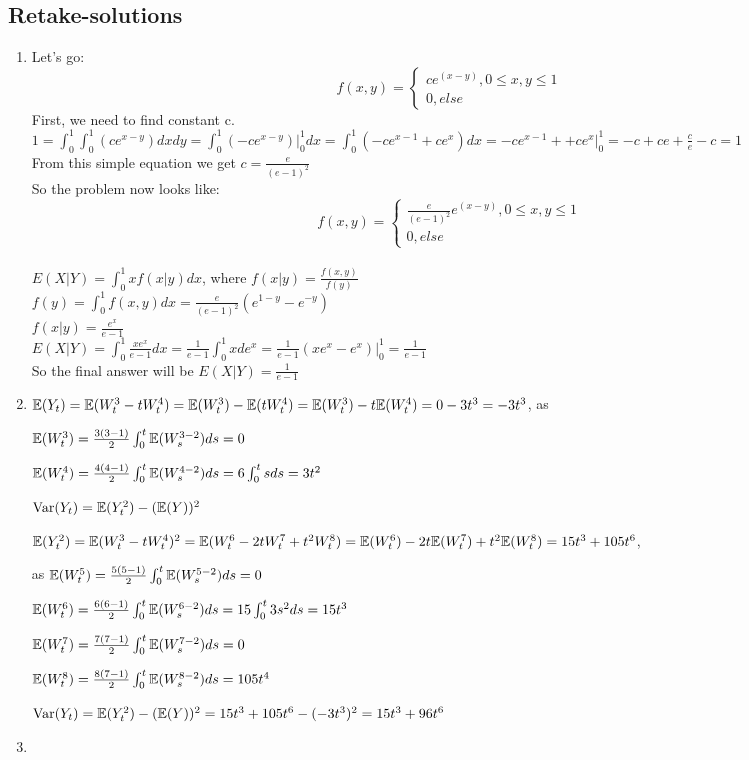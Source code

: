 \documentclass[12pt, a4paper]{article}
\begin{document}
\subsection{Retake-solutions}
\begin{enumerate}
\item Let's go:
\[
f(x,y)=
   \begin{cases}
   ce^{(x-y)}, 0 \leqslant x,y \leqslant 1\\
   0, else
      \end{cases}
\]
First, we need to find constant c.\\
$ 1=\int_{0}^{1} \int_{0}^{1} (ce^{x-y})dxdy=\int_{0}^{1}(-ce^{x-y})\bigg|_0^1dx=\int_{0}^{1}(-ce^{x-1}+ce^x)dx=-ce^{x-1}++ce^x\bigg|_0^1=-c+ce+\frac{c}{e}-c=1$\\
From this simple equation we get $c=\frac{e}{(e-1)^2}$\\
So the problem now looks like:
\[
f(x,y)=
\begin{cases}
   \frac{e}{(e-1)^2}e^{(x-y)}, 0 \leqslant x,y \leqslant 1\\
   0, else
\end{cases}
\]\\
$E(X|Y)=\int_{0}^{1}xf(x|y)dx$, where $f(x|y)=\frac{f(x,y)}{f(y)}$\\
$f(y)=\int_{0}^{1}f(x,y)dx=\frac{e}{(e-1)^2}(e^{1-y}-e^{-y})$\\
$f(x|y)=\frac{e^x}{e-1}$\\
$E(X|Y)=\int_{0}^{1}\frac{xe^x}{e-1}dx=\frac{1}{e-1}\int_{0}^{1}xde^x=\frac{1}{e-1}(xe^x-e^x)\bigg|_0^1=\frac{1}{e-1}$\\
So the final answer will be $E(X|Y)=\frac{1}{e-1}$

\item $\mathbb{E}(Y_t)=\mathbb{E}(W^3_t-tW^4_t) = \mathbb{E}(W^3_t)-\mathbb{E}(tW^4_t) = \mathbb{E}(W^3_t)-t \mathbb{E}(W^4_t)= 0 - 3t^3 = - 3t^3 $, as

$\mathbb{E}(W^{3}_{t})= \frac{3(3-1)}{2} \int_{0}^{t} \mathbb{E} (W^{3-2}_{s}) ds = 0 $

$\mathbb{E}(W^{4}_{t})= \frac{4(4-1)}{2} \int_{0}^{t} \mathbb{E} (W^{4-2}_{s}) ds = 6 \int_{0}^{t} s ds =3 t^2 $

$\operatorname{Var}(Y_t) =\mathbb{E}(Y^2_t)-(\mathbb{E}(Y))^2$

$\mathbb{E}(Y^2_t)=\mathbb{E}(W^3_t-tW^4_t)^2=\mathbb{E}(W^6_t-2tW^7_t+t^2 W^8_t)= \mathbb{E}(W^6_t)-2t\mathbb{E}(W^7_t)+t^2 \mathbb{E}(W^8_t) = 15t^3 + 105t^6$,

as $\mathbb{E}(W^{5}_{t})= \frac{5(5-1)}{2} \int_{0}^{t} \mathbb{E} (W^{5-2}_{s}) ds = 0 $

$\mathbb{E}(W^{6}_{t})= \frac{6(6-1)}{2} \int_{0}^{t} \mathbb{E} (W^{6-2}_{s}) ds = 15 \int_{0}^{t} 3s^2 ds= 15t^3 $

$\mathbb{E}(W^{7}_{t})= \frac{7(7-1)}{2} \int_{0}^{t} \mathbb{E} (W^{7-2}_{s}) ds = 0 $

$\mathbb{E}(W^{8}_{t})= \frac{8(7-1)}{2} \int_{0}^{t} \mathbb{E} (W^{8-2}_{s}) ds = 105t^4 $

$\operatorname{Var}(Y_t) =\mathbb{E}(Y^2_t)-(\mathbb{E}(Y))^2 = 15t^3 + 105t^6 - (-3t^3)^2= 15t^3 + 96 t^6$

\item
\end{enumerate}
\end{document}
